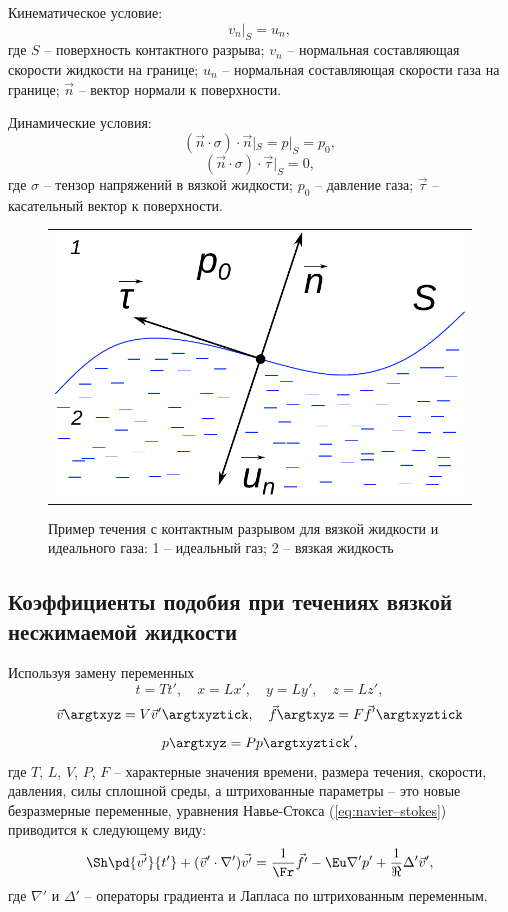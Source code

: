 \documentclass[a4paper, 14pt]{extarticle}
\begin{document}
\alert{Кинематическое} условие:
\[
v_n|_S = u_n,
\]
где $S$ -- поверхность контактного разрыва; $v_n$ -- нормальная составляющая скорости жидкости на границе; $u_n$ -- нормальная составляющая скорости газа на границе; $\vec{n}$ -- вектор нормали к поверхности.

\alert{Динамические} условия:
\[
(\vec{n}\cdot\sigma)\cdot\vec{n}|_S= p|_S = p_0,
\]
\[
(\vec{n}\cdot\sigma)\cdot\vec{\tau}|_S = 0,
\]
где $\sigma$ -- тензор напряжений в вязкой жидкости; $p_0$ -- давление газа; $\vec{\tau}$ -- касательный вектор к поверхности.

\begin{figure}
	\centering
	\begin{tabular}{c}
		\includegraphics[width=0.6\linewidth]{../img/free_bound} \\
	\end{tabular}
	\caption{Пример течения с контактным разрывом для вязкой жидкости и идеального газа: 1 -- идеальный газ; 2 -- вязкая жидкость}
	\label{fig:viscous_fluid_gas}
	
\end{figure}	

\subsection{Коэффициенты подобия при течениях вязкой несжимаемой жидкости}

Используя замену переменных 
\[
t = T t',\quad
x = L x',\quad 
y = L y',\quad
z = L z',			
\]
\[
\vec{v}\argtxyz = V \vec{v}'\argtxyztick,\quad
\vec{f}\argtxyz = F \vec{f}'\argtxyztick
\]
\[
p\argtxyz = P p\argtxyztick',
\]
где $T$, $L$, $V$, $P$, $F$ -- характерные значения времени, размера течения, скорости, давления, силы сплошной среды, а штрихованные параметры -- это новые безразмерные переменные, уравнения Навье-Стокса (\ref{eq:navier–stokes}) приводится к следующему виду:
\begin{equation}
\label{eq:Navier-Stokes_dim}
\Sh\pd{\vec{v'}}{t'} + (\vec{v}' \cdot \nabla') \vec{v'} = \frac{1}{\Fr} \vec{f'}  - \Eu \nabla' p' + 
\frac{1}{\Re} \Delta' \vec{v}',
\end{equation}
где $\nabla'$ и $\Delta'$ -- операторы градиента и Лапласа по штрихованным переменным.
\end{document}
